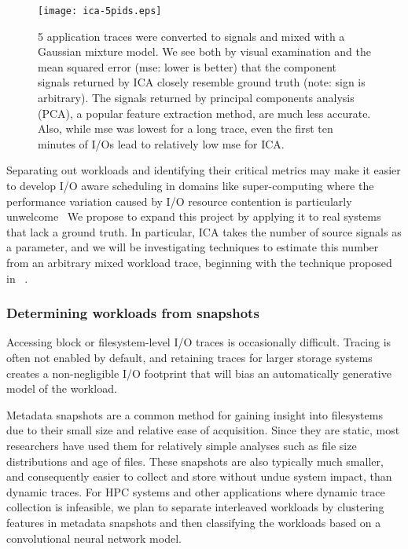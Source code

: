 \begin{figure}
  \centering
  \texttt{[image: ica-5pids.eps]}
  \caption{5 application traces were converted to signals and mixed with a
  Gaussian mixture model.  We see both by visual examination and the mean
  squared error (mse: lower is better) that the component signals returned by ICA closely resemble ground truth (note: sign is arbitrary).  The signals
  returned by principal components analysis (PCA), a popular feature extraction
  method, are much less accurate.  Also, while mse was lowest for a long
  trace, even the first ten minutes of I/Os lead to relatively low mse for ICA.}
  \label{fig:ica}
\end{figure}

Separating out workloads and identifying their critical metrics may make it
easier to develop I/O aware scheduling in domains like super-computing where the
performance variation caused by I/O
resource contention is particularly unwelcome~\cite{liufast14}
We propose to expand this project by applying it to real systems that lack a
ground truth.  In particular, ICA takes the number of source signals as a
parameter, and we will be investigating techniques to estimate this number from
an arbitrary mixed workload trace, beginning with the technique proposed in
~\cite{Sparse component analysis and blind source separation of underdetermined
mixtures
}. %

\subsubsection*{Determining workloads from snapshots }

Accessing block or filesystem-level I/O traces is occasionally difficult.
Tracing is often not enabled by default, and retaining traces for larger storage
systems creates a non-negligible I/O footprint that will bias an automatically
generative model of the workload. 

Metadata snapshots are a common method for gaining insight into filesystems due
to their small size and relative ease of acquisition. Since they are static,
most researchers have used them for relatively simple analyses such as file size
distributions and age of files. These snapshots are also typically much smaller,
and consequently easier to collect and store without undue system impact, than
dynamic traces.  For HPC systems and other applications where dynamic trace
collection is infeasible, we plan to separate interleaved workloads by clustering features in metadata snapshots and then classifying the workloads based on a convolutional neural network model.

